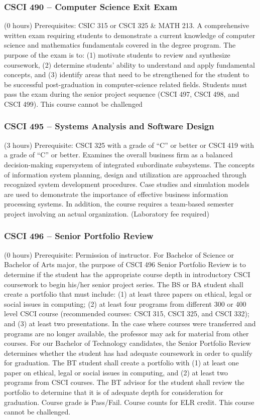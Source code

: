 \subsubsection{CSCI 490 -- Computer Science Exit Exam}
(0 hours) Prerequisites: CSIC 315 or CSCI 325 \& MATH 213. A comprehensive written exam requiring students to demonstrate a current knowledge of computer science and mathematics fundamentals covered in the degree program. The purpose of the exam is to: (1) motivate students to review and synthesize coursework, (2) determine students’ ability to understand and apply fundamental concepts, and (3) identify areas that need to be strengthened for the student to be successful post-graduation in computer-science related fields. Students must pass the exam during the senior project sequence (CSCI 497, CSCI 498, and CSCI 499). This course cannot be challenged

\subsubsection{CSCI 495 -- Systems Analysis and Software Design}
(3 hours) Prerequisite: CSCI 325 with a grade of “C” or better or CSCI 419 with a grade of “C” or better. Examines the overall business firm as a balanced decision-making supersystem of integrated subordinate subsystems. The concepts of information system planning, design and utilization are approached through recognized system development procedures. Case studies and simulation models are used to demonstrate the importance of effective business information processing systems. In addition, the course requires a team-based semester project involving an actual organization. (Laboratory fee required)

\subsubsection{CSCI 496 -- Senior Portfolio Review}
(0 hours) Prerequisite: Permission of instructor. For Bachelor of Science or Bachelor of Arts major, the purpose of CSCI 496 Senior Portfolio Review is to determine if the student has the appropriate course depth in introductory CSCI coursework to begin his/her senior project series. The BS or BA student shall create a portfolio that must include: (1) at least three papers on ethical, legal or social issues in computing; (2) at least four programs from different 300 or 400 level CSCI course (recommended courses: CSCI 315, CSCI 325, and CSCI 332); and (3) at least two presentations. In the case where courses were transferred and programs are no longer available, the professor may ask for material from other courses. For our Bachelor of Technology candidates, the Senior Portfolio Review determines whether the student has had adequate coursework in order to qualify for graduation. The BT student shall create a portfolio with (1) at least one paper on ethical, legal or social issues in computing, and (2) at least two programs from CSCI courses. The BT advisor for the student shall review the portfolio to determine that it is of adequate depth for consideration for graduation. Course grade is Pass/Fail. Course counts for ELR credit. This course cannot be challenged.

